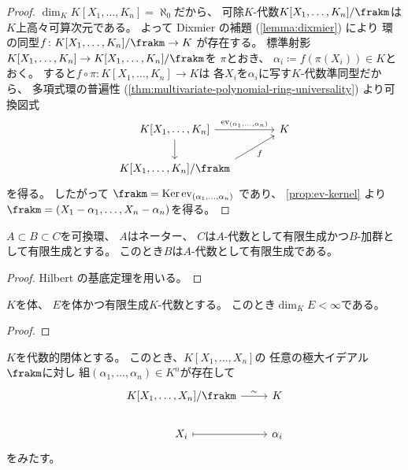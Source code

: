 \documentclass[report]{jlreq}
\begin{document}
\begin{proof}
    $\dim_K K[X_1, \dots, K_n] = \aleph_0$だから、
    可除$K$-代数$K[X_1, \dots, K_n] / \frakm$は
    $K$上高々可算次元である。
    よって Dixmier の補題 (\cref{lemma:dixmier}) により
    環の同型$f \colon K[X_1, \dots, K_n] / \frakm \to K$
    が存在する。
    標準射影
    $K[X_1, \dots, K_n] \to K[X_1, \dots, K_n] / \frakm$を
    $\pi$とおき、
    $\alpha_i \coloneqq f(\pi(X_i)) \in K$とおく。
    すると$f \circ \pi \colon K[X_1, \dots, K_n] \to K$は
    各$X_i$を$\alpha_i$に写す$K$-代数準同型だから、
    多項式環の普遍性
    (\cref{thm:multivariate-polynomial-ring-universality})
    より可換図式
    \begin{equation}
        \begin{tikzcd}[column sep=large]
            K[X_1, \dots, K_n]
                \ar{r}{\ev_{(\alpha_1, \dots, \alpha_n)}}
                \ar{d}
                & K \\
            K[X_1, \dots, K_n] / \frakm
                \ar[start anchor=north east]{ru}[swap]{f}
        \end{tikzcd}
    \end{equation}
    を得る。
    したがって
    $\frakm = \Ker \ev_{(\alpha_1, \dots, \alpha_n)}$
    であり、
    \cref{prop:ev-kernel}
    より$\frakm = (X_1 - \alpha_1, \dots, X_n - \alpha_n)$を得る。
\end{proof}

\begin{theorem}
    $A \subset B \subset C$を可換環、
    $A$はネーター、
    $C$は$A$-代数として有限生成かつ$B$-加群として有限生成とする。
    このとき$B$は$A$-代数として有限生成である。
\end{theorem}

\begin{proof}
    Hilbert の基底定理を用いる。
    \TODO{}
\end{proof}

\begin{theorem}
    $K$を体、
    $E$を体かつ有限生成$K$-代数とする。
    このとき$\dim_K E < \infty$である。
\end{theorem}

\begin{proof}
    \TODO{}
\end{proof}


\begin{corollary}
    $K$を代数的閉体とする。
    このとき、$K[X_1, \dots, X_n]$の
    任意の極大イデアル$\frakm$に対し
    組$(\alpha_1, \dots, \alpha_n) \in K^n$が存在して
    \begin{equation}
        \begin{tikzcd}
            K[X_1, \dots, X_n] / \frakm
                \ar{r}{\sim}
                & K \\
            X_i
                \ar[mapsto]{r}
                & \alpha_i
        \end{tikzcd}
    \end{equation}
    をみたす。
\end{corollary}
\end{document}
